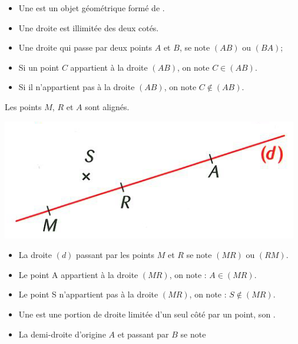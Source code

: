 \begin{mydefs}
	
	\begin{itemize}
		\item Une  est un objet géométrique formé de . 
		\item Une droite est illimitée des deux cotés.
		\item Une droite qui passe par deux points $A$ et $B$, se note $(AB)$ ou $(BA)$;
		\item Si un point $C$ appartient à la droite $(AB)$, on note $C \in (AB)$.
		\item Si il n'appartient pas à la droite $(AB)$, on note $C \notin (AB)$.
	\end{itemize}
\end{mydefs}

\newpage

\begin{myex}
	Les points $M$, $R$ et $A$ sont alignés.
	\begin{center}
		\includegraphics[scale=0.55]{img/droite1}
	\end{center}

	\begin{itemize}
		\item La droite $(d)$ passant par les points $M$ et $R$ se note $(MR)$ ou $(RM)$.
		\item Le point A appartient à la droite $(MR)$, on note : $A \in (MR)$.
		\item Le point S n'appartient pas à la droite $(MR)$, on note : $S \notin (MR)$.
	\end{itemize}
\end{myex}

\begin{mydef}
	\begin{itemize}
		\item Une  est une portion de droite limitée d'un seul côté par un point, son .
		
		\item La demi-droite d'origine $A$ et passant par $B$ se note%
	\end{itemize}
	
\end{mydef}


